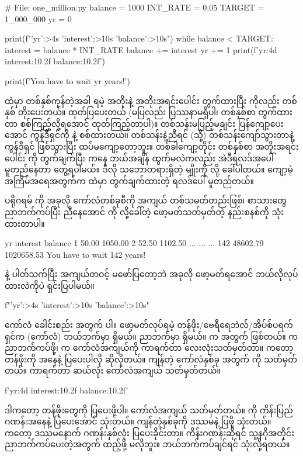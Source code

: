 %
\begin{py}
# File: one_million.py
balance = 1000
INT_RATE = 0.05
TARGET = 1_000_000
yr = 0

print(f"{'yr':>4s} {'interest':>10s} {'balance':>10s}")
while balance < TARGET:
    interest = balance * INT_RATE
    balance += interest
    yr += 1
    print(f'{yr:4d} {interest:10.2f} {balance:10.2f}')

print(f'You have to wait {yr} years!')
\end{py}
%
  ထဲမှာ တစ်နှစ်ကုန်တဲ့အခါ ရမဲ့ အတိုးနဲ့ အတိုးအရင်းပေါင်း တွက်ထားပြီး   ကိုလည်း တစ်နှစ် တိုးပေးတယ်။ \fEn{,} \fEn{,}  ထုတ်ပြပေးတယ် (မပြလည်း ပြဿနာမရှိပါ၊ တစ်နှစ်စာ တွက်ထားတာ စစ်ကြည့်လို့ရအောင် ထုတ်ကြည့်တာပါ)။ တစ်သန်းမပြည့်မချင်း ပြန်ကျော့ပေးအောင်  ကွန်ဒီရှင်ကို  နဲ့ စစ်ထားတယ်။ တစ်သန်းနဲ့ညီရင် (သို့) တစ်သန်းကျော်သွားတာနဲ့ ကွန်ဒီရှင်  ဖြစ်သွားပြီး ထပ်မကျော့တော့ဘူး။  တစ်ခါကျော့တိုင်း တစ်နှစ်စာ အတိုးအရင်းပေါင်း  ကို တွက်ချက်ပြီး  ကနေ ဘယ်အချိန် ထွက်မလဲကလည်း အဲဒီရလဒ်အပေါ် မူတည်နေတာ တွေ့ရပါမယ်။ ဒီလို သဘောတရားရှိတဲ့  မျိုးကို  လို့ ခေါ်ပါတယ်။ ကျော့မဲ့ အကြိမ်အရေအတွက်က  ထဲမှာ တွက်ချက်ထားတဲ့ ရလဒ်ပေါ် မူတည်တယ်။

ပရိုဂရမ်  ကို အခုလို ကော်လံတစ်ခုစီကို အကျယ် တစ်သမတ်တည်းဖြစ်၊ စာသားတွေ ညာဘက်ကပ်ပြီး ညီနေအောင်  ကို  လို့ခေါ်တဲ့ ဖော့မတ်သတ်မှတ်တဲ့ နည်းစနစ်ကို သုံးထားတာပါ။
\begin{codetxt}
  yr   interest    balance
   1      50.00    1050.00
   2      52.50    1102.50
 ...      ...      ...    
 142   48602.79 1020658.53
You have to wait 142 years!
\end{codetxt}
 နဲ့ ပါတ်သက်ပြီး အကျယ်တဝင့် မဖော်ပြတော့ဘဲ အခုလို ဖော့မတ်ရအောင် ဘယ်လိုလုပ်ထားလဲကိုပဲ ရှင်းပြပါမယ်။
%
\begin{py}
f"{'yr':>4s} {'interest':>10s} {'balance':>10s}"
\end{py}
%
ကော်လံ ခေါင်းစည်း အတွက်  ပါ။ ဖော့မတ်လုပ်ရမဲ့ တန်ဖိုး/ဗေရီရေဘဲလ်/အိပ်စ်ပရက်ရှင်က \fCode{:} (ကော်လံ) ဘယ်ဘက်မှာ ရှိမယ်။ ညာဘက်မှာ   ရှိမယ်။  က  အတွက်  ဖြစ်တယ်။ \fCodeBf{>} က ညာဘက်ကပ်ဖို့၊  က ကော်လံအကျယ်ကို ကာရက်တာ လေးလုံးသတ်မှတ်တာ။  ကတော့ တန်ဖိုးကို  အနေနဲ့ ပြပေးပါလို ဆိုလိုတယ်။ ကျန်တဲ့ ကော်လံနှစ်ခု အတွက်  ကို  သတ်မှတ်တယ်။  ကာရက်တာ ဆယ်လုံး ကော်လံအကျယ် သတ်မှတ်တယ်။
%
\begin{py}
f'{yr:4d} {interest:10.2f} {balance:10.2f}'
\end{py}
%
ဒါကတော့ \fEn{,} \fEn{,}  တန်ဖိုးတွေကို ပြပေးဖို့ပါ။ ကော်လံအကျယ် \fEn{,} \fEn{,}  သတ်မှတ်တယ်။  ကို ကိန်းပြည်ဂဏန်းအနေနဲ့ ပြပေးအောင်  သုံးတယ်။ ကျန်တဲ့နှစ်ခုကို ဒဿမနဲ့ ပြဖို့  သုံးတယ်။  ကတော့ ဒဿမနောက် ဂဏန်းနှစ်လုံး ပြပေးခိုင်းတာ။ ကိန်းဂဏန်းဆိုရင် သူ့နဂိုအတိုင်း ညာဘက်ကပ်ပေးတဲ့အတွက် \fCode{>} ထည့်ဖို့ မလိုဘူး။ ဘယ်ဘက်ကပ်ချင်ရင် \fCode{<} သုံးလို့ရတယ်။

